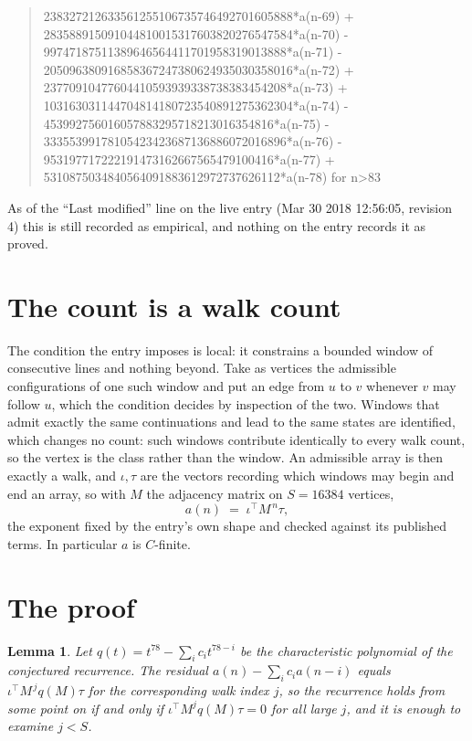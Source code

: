 \documentclass[11pt,a4paper]{article}
\theoremstyle{plain}
\newtheorem{lemma}[theorem]{Lemma}
\theoremstyle{definition}
\begin{document}
\begin{quote}
238327212633561255106735746492701605888*a(n-69) + 283588915091044810015317603820276547584*a(n-70) - 99747187511389646564411701958319013888*a(n-71) - 205096380916858367247380624935030358016*a(n-72) + 23770910477604410593939338738383454208*a(n-73) + 103163031144704814180723540891275362304*a(n-74) - 453992756016057883295718213016354816*a(n-75) - 33355399178105423423687136886072016896*a(n-76) - 953197717222191473162667565479100416*a(n-77) + 5310875034840564091883612972737626112*a(n-78) for n>83
\end{quote}
As of the ``Last modified'' line on the live entry (Mar 30 2018 12:56:05, revision 4) this is still
recorded as empirical, and nothing on the entry records it as proved.

\section{The count is a walk count}

The condition the entry imposes is local: it constrains a bounded window of consecutive lines and nothing beyond. Take as vertices the admissible configurations of one such window and put an edge from $u$ to $v$ whenever $v$ may follow $u$, which the condition decides by inspection of the two. Windows that admit exactly the same continuations and lead to the same states are identified, which changes no count: such windows contribute identically to every walk count, so the vertex is the class rather than the window.
An admissible array is then exactly a walk, and $\iota,\tau$ are the vectors recording which windows may begin and end an array, so with $M$ the adjacency matrix on $S=16384$ vertices,
\[
a(n)\;=\;\iota^{\!\top}M^{\,n}\tau ,
\]
the exponent fixed by the entry's own shape and checked against its published terms. In
particular $a$ is $C$-finite.

\section{The proof}

\begin{lemma}\label{lem:crit}
Let $q(t)=t^{78}-\sum_i c_it^{78-i}$ be the characteristic polynomial of the
conjectured recurrence. The residual $a(n)-\sum_ic_ia(n-i)$ equals
$\iota^{\!\top}M^{\,j}q(M)\tau$ for the corresponding walk index $j$, so the recurrence
holds from some point on if and only if $\iota^{\!\top}M^{j}q(M)\tau=0$ for all large $j$,
and it is enough to examine $j<S$.
\end{lemma}
\end{document}
